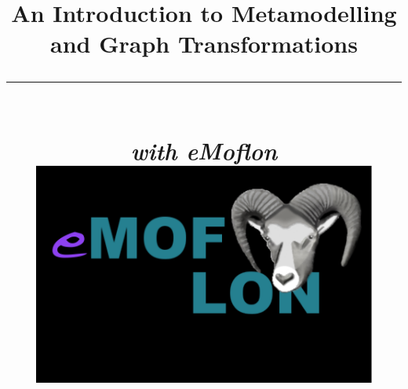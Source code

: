 \title{
\flushright
{\LARGE\bfseries An Introduction to Metamodelling\\
and Graph Transformations}
\noindent\rule[-1ex]{\textwidth}{5pt}\\[2.5ex]
\hfill\emph{\LARGE\bfseries with eMoflon}\\
\vspace{1cm}
\includegraphics[width=0.85\textwidth]{pics/emoflon} 
}

\date{}  
\author{} 